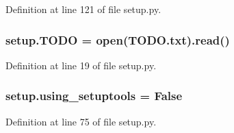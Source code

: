 Definition at line 121 of file setup.\+py.

\subsubsection[{\texorpdfstring{T\+O\+DO}{TODO}}]{\setlength{\rightskip}{0pt plus 5cm}setup.\+T\+O\+DO = open(\textquotesingle{}T\+O\+D\+O.\+txt\textquotesingle{}).read()}\hypertarget{namespacesetup_a96e41601b0756d4ffd1ab86d8590cfb2}{}\label{namespacesetup_a96e41601b0756d4ffd1ab86d8590cfb2}


Definition at line 19 of file setup.\+py.

\subsubsection[{\texorpdfstring{using\+\_\+setuptools}{using_setuptools}}]{ setup.\+using\+\_\+setuptools = False}\hypertarget{namespacesetup_a04f025c3b16747ab994288015f985f2f}{}\label{namespacesetup_a04f025c3b16747ab994288015f985f2f}


Definition at line 75 of file setup.\+py.

